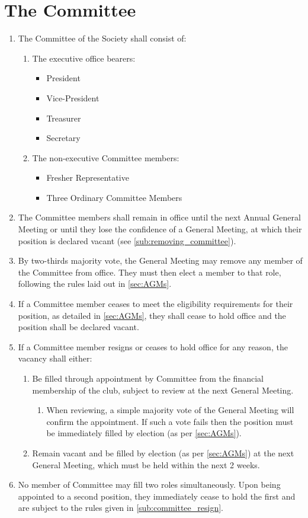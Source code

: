 \documentclass[a4paper]{article}
\newenvironment{enumsection}[1]{\section{#1} \begin{enumerate}[ref=\thesection.\theenumi]}{\end{enumerate}}
\begin{document}
\begin{enumsection}{The Committee} \label{sec:committee}
	\item The Committee of the Society shall consist of:
    \begin{enumerate}
    	\item The executive office bearers:
        \begin{itemize}
          \item President
          \item Vice-President
          \item Treasurer
          \item Secretary 
        \end{itemize}
        \item The non-executive Committee members:
        \begin{itemize}
            \item Fresher Representative
        	\item Three Ordinary Committee Members
        \end{itemize}
    \end{enumerate}
    \item The Committee members shall remain in office until the next Annual General Meeting or until they lose the confidence of a General Meeting, at which their position is declared vacant (see \cref{sub:removing_committee}).
    \item \label{sub:removing_committee} By two-thirds majority vote, the General Meeting may remove any member of the Committee from office. They must then elect a member to that role, following the rules laid out in \cref{sec:AGMs}.
    \item If a Committee member ceases to meet the eligibility requirements for their position, as detailed in \cref{sec:AGMs}, they shall cease to hold office and the position shall be declared vacant.
    \item \label{sub:committee_resign} If a Committee member resigns or ceases to hold office for any reason, the vacancy shall either:
    \begin{enumerate}
        \item Be filled through appointment by Committee from the financial membership of the club, subject to review at the next General Meeting.
        \begin{enumerate}
            \item When reviewing, a simple majority vote of the General Meeting will confirm the appointment. If such a vote fails then the position must be immediately filled by election (as per \cref{sec:AGMs}).
        \end{enumerate}
        \item Remain vacant and be filled by election (as per \cref{sec:AGMs}) at the next General Meeting, which must be held within the next 2 weeks.
    \end{enumerate}
    \item No member of Committee may fill two roles simultaneously. Upon being appointed to a second position, they immediately cease to hold the first and are subject to the rules given in \cref{sub:committee_resign}.
\end{enumsection}
\end{document}
